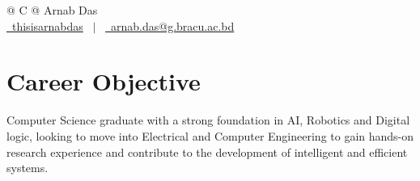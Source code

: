 \documentclass[a4paper,12pt]{article}
\begin{document}
\pagestyle{empty}



\begin{tabularx}{\linewidth}{@{} C @{}}
    \Huge{Arnab Das}                                                                                            \\[7.5pt]
    \href{https://github.com/thisisarnabdas}{\raisebox{-0.05\height}\faGithub\ thisisarnabdas} \ $|$ \
    \href{mailto:arnab.das@g.bracu.ac.bd}{\raisebox{-0.05\height}\faEnvelope \ arnab.das@g.bracu.ac.bd} \\
\end{tabularx}


\section{Career Objective}

Computer Science graduate with a strong foundation in AI, Robotics and Digital logic, looking to move into Electrical and Computer Engineering to gain hands-on research experience and contribute to the development of intelligent and efficient systems.
\end{document}
